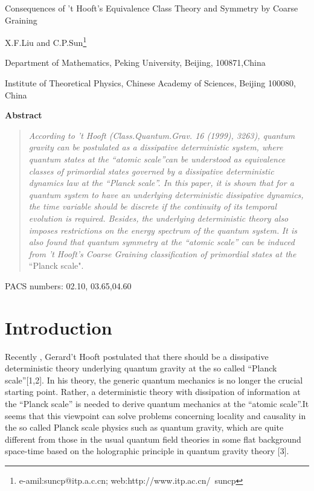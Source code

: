 \documentclass[a4paper,12pt]{article}
\begin{document}
\begin{center}
{\LARGE Consequences of 't Hooft's Equivalence Class Theory and Symmetry by }%
{\Large Coarse Graining}

X.F.Liu \coordHE{} and C.P.Sun\coordHE{}\footnote{%
e-amil:suncp@itp.a.c.cn; web:http://www.itp.ac.cn/~suncp}

\coordHE{}Department of Mathematics, Peking University, Beijing, 100871,China

\bigskip {}\coordHE{}Institute of Theoretical Physics, Chinese Academy of Sciences,
Beijing 100080, China

\textbf{Abstract}
\end{center}

\begin{quotation}
\textit{According to 't Hooft (Class.Quantum.Grav. 16 (1999), 3263), quantum
gravity can be postulated as a dissipative deterministic system, where
quantum states at the ``atomic scale''can be understood as equivalence
classes of primordial states governed by a dissipative deterministic
dynamics law at the ``Planck scale''. In this paper, it is shown that for a
quantum system to have an underlying deterministic dissipative dynamics, the
time variable should be discrete if the continuity of its temporal evolution
is required. Besides, the underlying deterministic theory also imposes
restrictions on the energy spectrum of the quantum system. } \textit{It is
also found that quantum symmetry at the ``atomic scale'' can be induced from
't Hooft's Coarse Graining classification of primordial states at the}
``Planck scale".
\end{quotation}

PACS numbers: 02.10, 03.65,04.60

\section{Introduction}

Recently , Gerard't Hooft postulated that there should be a dissipative
deterministic theory underlying quantum gravity at the so called ``Planck
scale''[1,2]. In his theory, the generic quantum mechanics is no longer the
crucial starting point. Rather, a deterministic theory with dissipation of
information at the ``Planck scale'' is needed to derive quantum mechanics at
the ``atomic scale''.It seems that this viewpoint can solve problems
concerning locality and causality in the so called Planck scale physics such
as quantum gravity, which are quite different from those in the usual
quantum field theories in some flat background space-time based on the
holographic principle in quantum gravity theory [3].
\end{document}
